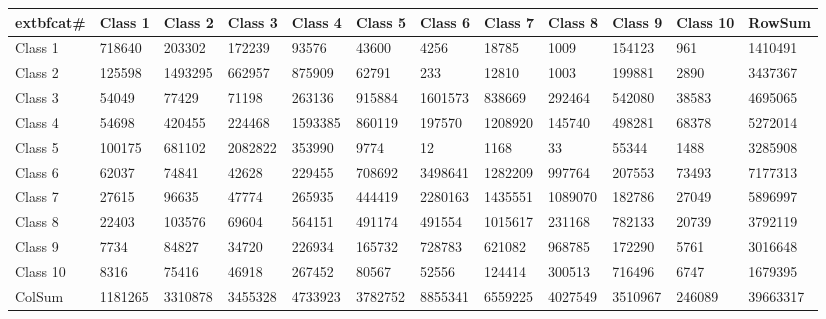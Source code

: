 ﻿\begin{table}[!ht]
    \centering
    \begin{tabular}{|l|l|l|l|l|l|l|l|l|l|l|l|}
    \hline
        	extbf{cat\#} & \textbf{Class 1} & \textbf{Class 2} & \textbf{Class 3} & \textbf{Class 4} & \textbf{Class 5} & \textbf{Class 6} & \textbf{Class 7} & \textbf{Class 8} & \textbf{Class 9} & \textbf{Class 10} & \textbf{RowSum} \\ \hline
        Class 1 & 718640 & 203302 & 172239 & 93576 & 43600 & 4256 & 18785 & 1009 & 154123 & 961 & 1410491 \\ \hline
        Class 2 & 125598 & 1493295 & 662957 & 875909 & 62791 & 233 & 12810 & 1003 & 199881 & 2890 & 3437367 \\ \hline
        Class 3 & 54049 & 77429 & 71198 & 263136 & 915884 & 1601573 & 838669 & 292464 & 542080 & 38583 & 4695065 \\ \hline
        Class 4 & 54698 & 420455 & 224468 & 1593385 & 860119 & 197570 & 1208920 & 145740 & 498281 & 68378 & 5272014 \\ \hline
        Class 5 & 100175 & 681102 & 2082822 & 353990 & 9774 & 12 & 1168 & 33 & 55344 & 1488 & 3285908 \\ \hline
        Class 6 & 62037 & 74841 & 42628 & 229455 & 708692 & 3498641 & 1282209 & 997764 & 207553 & 73493 & 7177313 \\ \hline
        Class 7 & 27615 & 96635 & 47774 & 265935 & 444419 & 2280163 & 1435551 & 1089070 & 182786 & 27049 & 5896997 \\ \hline
        Class 8 & 22403 & 103576 & 69604 & 564151 & 491174 & 491554 & 1015617 & 231168 & 782133 & 20739 & 3792119 \\ \hline
        Class 9 & 7734 & 84827 & 34720 & 226934 & 165732 & 728783 & 621082 & 968785 & 172290 & 5761 & 3016648 \\ \hline
        Class 10 & 8316 & 75416 & 46918 & 267452 & 80567 & 52556 & 124414 & 300513 & 716496 & 6747 & 1679395 \\ \hline
        ColSum & 1181265 & 3310878 & 3455328 & 4733923 & 3782752 & 8855341 & 6559225 & 4027549 & 3510967 & 246089 & 39663317 \\ \hline
    \end{tabular}
\end{table}